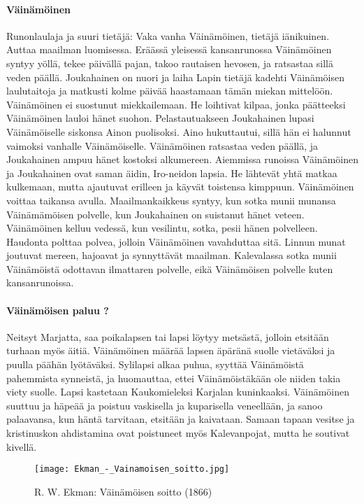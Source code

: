   \paragraph{Väinämöinen} Runonlaulaja ja suuri tietäjä: Vaka vanha Väinämöinen, tietäjä 
    iänikuinen. Auttaa maailman luomisessa. Eräässä yleisessä kansanrunossa Väinämöinen syntyy 
    yöllä, tekee päivällä pajan, takoo rautaisen hevosen, ja ratsastaa sillä veden päällä. 
    Joukahainen on nuori ja laiha Lapin tietäjä kadehti Väinämöisen laulutaitoja ja matkusti 
    kolme päivää haastamaan tämän miekan mittelöön. Väinämöinen ei suostunut miekkailemaan. He 
    loihtivat kilpaa, jonka päätteeksi Väinämöinen lauloi hänet suohon. Pelastautuakseen 
    Joukahainen lupasi Väinämöiselle siskonsa Ainon puolisoksi. Aino hukuttautui, sillä hän ei 
    halunnut vaimoksi vanhalle Väinämöiselle. Väinämöinen ratsastaa veden päällä, ja Joukahainen 
    ampuu hänet kostoksi alkumereen. Aiemmissa runoissa Väinämöinen ja Joukahainen ovat saman 
    äidin, Iro-neidon lapsia. He lähtevät yhtä matkaa kulkemaan, mutta ajautuvat erilleen ja 
    käyvät toistensa kimppuun. Väinämöinen voittaa taikansa avulla. Maailmankaikkeus syntyy, kun 
    sotka munii munansa Väinämämöisen polvelle, kun Joukahainen on suistanut hänet veteen. 
    Väinämöinen kelluu vedessä, kun vesilintu, sotka, pesii hänen polvelleen. Haudonta polttaa 
    polvea, jolloin Väinämöinen vavahduttaa sitä. Linnun munat joutuvat mereen, hajoavat ja 
    synnyttävät maailman. Kalevalassa sotka munii Väinämöistä odottavan ilmattaren polvelle, 
    eikä Väinämöisen polvelle kuten kansanrunoissa. 
  \paragraph{Väinämöisen paluu ?} Neitsyt Marjatta, saa poikalapsen tai lapsi löytyy metsästä, 
    jolloin etsitään turhaan myös äitiä. Väinämöinen määrää lapsen äpäränä suolle vietäväksi ja 
    puulla päähän lyötäväksi. Sylilapsi alkaa puhua, syyttää Väinämöistä pahemmista synneistä, 
    ja huomauttaa, ettei Väinämöistäkään ole niiden takia viety suolle. Lapsi kastetaan 
    Kaukomieleksi Karjalan kuninkaaksi. Väinämöinen suuttuu ja häpeää ja poistuu vaskisella ja 
    kuparisella veneellään, ja sanoo palaavansa, kun häntä tarvitaan, etsitään ja kaivataan. 
    Samaan tapaan vesitse ja kristinuskon ahdistamina ovat poistuneet myös Kalevanpojat, mutta 
    he soutivat kivellä.

  \begin{figure}[!hb]
    \caption{R. W. Ekman: Väinämöisen soitto (1866)}
    \centering
    \texttt{[image: Ekman\_-\_Vainamoisen\_soitto.jpg]}
  \end{figure}  



